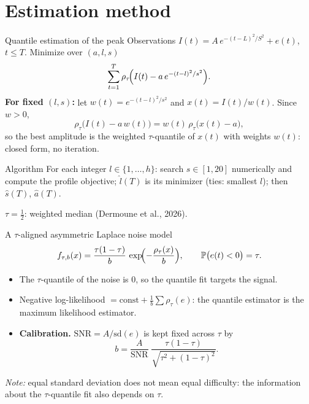 \documentclass[aspectratio=54,10pt]{beamer}
\begin{document}
\section{Estimation method}

\begin{frame}{Quantile estimation of the peak}
\justifying
Observations $I(t)=A\,e^{-(t-L)^2/S^2}+e(t)$, $t\le T$. Minimize over $(a,l,s)$
\[
\sum_{t=1}^{T}\rho_\tau\!\Bigl(I(t)-a\,e^{-(t-l)^2/s^2}\Bigr).
\]
\textbf{For fixed $(l,s)$:} let $w(t)=e^{-(t-l)^2/s^2}$ and $x(t)=I(t)/w(t)$. Since $w>0$,
\[
\rho_\tau\bigl(I(t)-a\,w(t)\bigr)=w(t)\,\rho_\tau\bigl(x(t)-a\bigr),
\]
so the best amplitude is the \alert{weighted $\tau$-quantile} of $x(t)$ with weights $w(t)$:
closed form, no iteration.
\vspace{0.2cm}
\begin{block}{Algorithm}
	For each integer $l\in\{1,\dots,h\}$: search $s\in[1,20]$ numerically and compute the
	profile objective; $\hat l(T)$ is its minimizer (ties: smallest $l$); then $\hat s(T)$, $\hat a(T)$.
\end{block}
\small $\tau=\tfrac12$: weighted median (Dermoune et al., 2026).
\end{frame}


\begin{frame}{A $\tau$-aligned asymmetric Laplace noise model}
\justifying
\begin{equation*}
	f_{\tau,b}(x)=\frac{\tau(1-\tau)}{b}\,\exp\!\Bigl(-\frac{\rho_\tau(x)}{b}\Bigr),
	\qquad \mathbb P\bigl(e(t)<0\bigr)=\tau .
\end{equation*}
\begin{itemize}
	\item The $\tau$-quantile of the noise is $0$, so the quantile fit targets the signal.
	\item Negative log-likelihood $=\text{const}+\tfrac1b\sum\rho_\tau(e)$: the
	quantile estimator is the \alert{maximum likelihood estimator}.
	\item \textbf{Calibration.} $\mathrm{SNR}=A/\mathrm{sd}(e)$ is kept fixed across $\tau$ by
	\[
	b=\frac{A}{\mathrm{SNR}}\;\frac{\tau(1-\tau)}{\sqrt{\tau^2+(1-\tau)^2}} .
	\]
\end{itemize}
\vspace{0.1cm}
\small \emph{Note:} equal standard deviation does not mean equal difficulty: the information about
the $\tau$-quantile fit also depends on $\tau$.
\end{frame}
\end{document}
